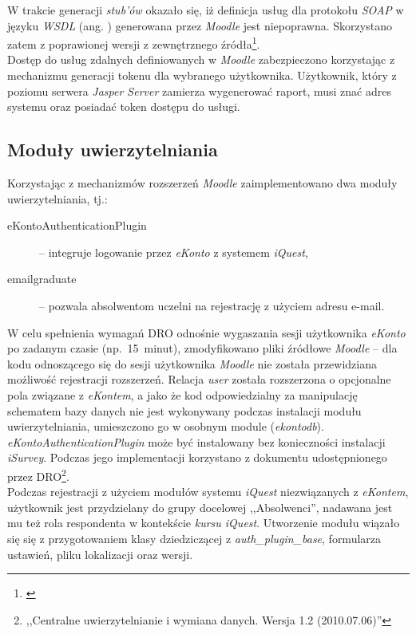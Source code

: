 W trakcie generacji \textit{stub'ów} okazało się, iż definicja usług dla protokołu \textit{SOAP} w języku \textit{WSDL} (ang. ) generowana przez \textit{Moodle} jest niepoprawna. Skorzystano zatem z poprawionej wersji z zewnętrznego źródła\footnote{\cite{GITHUB:MoodleSoap}}. \\

Dostęp do usług zdalnych definiowanych w \textit{Moodle} zabezpieczono korzystając z mechanizmu generacji tokenu dla wybranego użytkownika. Użytkownik, który z poziomu serwera \textit{Jasper Server} zamierza wygenerować raport, musi znać adres systemu oraz posiadać token dostępu do usługi.

\subsection{Moduły uwierzytelniania}
\label{Chapter662}

Korzystając z mechanizmów rozszerzeń \textit{Moodle} zaimplementowano dwa moduły uwierzytelniania, tj.:

\begin{description}
\item[eKontoAuthenticationPlugin] -- integruje logowanie przez \textit{eKonto} z systemem \textit{iQuest},
\item[emailgraduate] -- pozwala absolwentom uczelni na rejestrację z użyciem adresu e-mail.
\end{description}

W celu spełnienia wymagań DRO odnośnie wygaszania sesji użytkownika \textit{eKonto} po zadanym czasie (np.~15~minut), zmodyfikowano pliki źródłowe \textit{Moodle} -- dla kodu odnoszącego się do sesji użytkownika \textit{Moodle} nie została przewidziana możliwość rejestracji rozszerzeń. Relacja \textit{user} została rozszerzona o opcjonalne pola związane z \textit{eKontem}, a jako że kod odpowiedzialny za manipulację schematem bazy danych nie jest wykonywany podczas instalacji modułu uwierzytelniania, umieszczono go w osobnym module (\textit{ekontodb}). \textit{eKontoAuthenticationPlugin} może być instalowany bez konieczności instalacji \textit{iSurvey}. Podczas jego implementacji korzystano z dokumentu udostępnionego przez DRO\footnote{,,Centralne uwierzytelnianie i wymiana danych. Wersja 1.2 (2010.07.06)''\cite{PP:CUiWD10}}. \\

Podczas rejestracji z użyciem modułów systemu \textit{iQuest} niezwiązanych z \textit{eKontem}, użytkownik jest przydzielany do grupy docelowej ,,Absolwenci'', nadawana jest mu też rola respondenta w kontekście \textit{kursu iQuest}. Utworzenie modułu wiązało się się z przygotowaniem klasy dziedziczącej z \textit{auth\_plugin\_base}, formularza ustawień, pliku lokalizacji oraz wersji.

